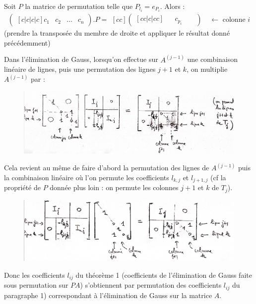 \begin{remark}
    Soit $P$ la matrice de permutation telle que $P_{l_{i}} = e_{P_i}$.
    Alors :
    \[
        \begin{pmatrix}[c|c|c|c]
            c_1 & c_2 & \dots & c_n
        \end{pmatrix}
        .
        P
        =
        \begin{matrix}[cc]
        \begin{pmatrix}[cc|c|cc]
            & & c_{p_i} & & 
        \end{pmatrix}
        \end{matrix}
        \text{ $\leftarrow$ colonne $i$}
    \]
(prendre la transposée du membre de droite et appliquer le résultat donné précédemment)

Dans l'élimination de Gauss, lorsqu'on effectue sur $A^{(j-1)}$ une combinaison linéaire de lignes, puis une permutation des lignes $j+1$ et $k$, on multiplie $A^{(j-1)}$ par :
\begin{figure}[h]
    \centering
    \includegraphics[scale=0.33]{matrices1.png}
\end{figure}

Cela revient au même de faire d'abord la permutation des lignes de $A^{(j-1)}$ puis la
combinaison linéaire où l'on permute les coefficients $l_{k,j}$ et $l_{j+1,j}$ (cf la
propriété de $P$ donnée plus loin : on permute les colonnes $j+1$ et $k$ de $T_j$).
\begin{figure}[h]
    \centering
    \includegraphics[scale=0.45]{matrices2.png}
\end{figure}

Donc les coefficients $l_{ij}$ du théorème 1 (coefficients de l'élimination de Gauss faite
sous permutation sur $PA$) s'obtiennent par permutation des coefficients $l_{ij}$ du
paragraphe 1) correspondant à l'élimination de Gauss sur la matrice $A$.
\end{remark}



